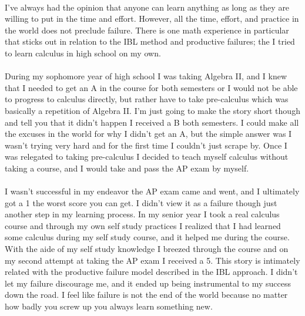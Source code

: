 \documentclass{article}
\begin{document}
    \paragraph{}
        I've always had the opinion that anyone can learn anything as long as they are willing to put in the time and effort. However, all the time, effort, and practice in the world does not preclude failure. There is one math experience in particular that sticks out in relation to the IBL method and productive failures; the I tried to learn calculus in high school on my own.
    \paragraph{}
        During my sophomore year of high school I was taking Algebra II, and I knew that I needed to get an A in the course for both semesters or I would not be able to progress to calculus directly, but rather have to take pre-calculus which was basically a repetition of Algebra II. I'm just going to make the story short though and tell you that it didn't happen I received a B both semesters. I could make all the excuses in the world for why I didn't get an A, but the simple answer was I wasn't trying very hard and for the first time I couldn't just scrape by. Once I was relegated to taking pre-calculus I decided to teach myself calculus without taking a course, and I would take and pass the AP exam by myself.

    \paragraph{}
        I wasn't successful in my endeavor the AP exam came and went, and I ultimately got a 1 the worst score you can get. I didn't view it as a failure though just another step in my learning process. In my senior year I took a real calculus course and through my own self study practices I realized that I had learned some calculus during my self study course, and it helped me during the course. With the aide of my self study knowledge I breezed through the course and on my second attempt at  taking the AP exam I received a 5. This story is intimately related with the productive failure model described in the IBL approach. I didn't let my failure discourage me, and it ended up being instrumental to my success down the road. I feel like failure is not the end of the world because no matter how badly you screw up you always learn something new.

    
  
\end{document}
